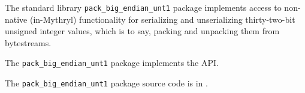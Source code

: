 
The standard library {\tt pack\_big\_endian\_unt1} package implements access to 
non-native (in-Mythryl) functionality for 
serializing and unserializing thirty-two-bit unsigned integer values, which is to say, 
packing and unpacking them from bytestreams.

The {\tt pack\_big\_endian\_unt1} package implements the 
 API.

The {\tt pack\_big\_endian\_unt1} package source code is in .




